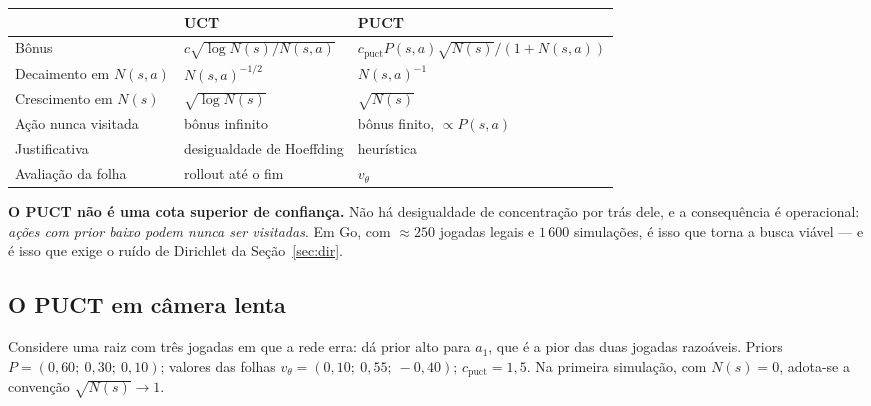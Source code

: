 \documentclass[11pt]{article}
\newcommand{\cpuct}{c_{\mathrm{puct}}}
\newcommand{\Nvis}{N}
\newcommand{\redeval}{v_{\theta}}
\begin{document}
\begin{center}
\begin{tabular}{lll}
\toprule
 & \textbf{UCT} & \textbf{PUCT} \\
\midrule
Bônus & $c\sqrt{\log \Nvis(s)/\Nvis(s,a)}$ & $\cpuct P(s,a)\sqrt{\Nvis(s)}/(1+\Nvis(s,a))$ \\
Decaimento em $\Nvis(s,a)$ & $\Nvis(s,a)^{-1/2}$ & $\Nvis(s,a)^{-1}$ \\
Crescimento em $\Nvis(s)$ & $\sqrt{\log \Nvis(s)}$ & $\sqrt{\Nvis(s)}$ \\
Ação nunca visitada & bônus infinito & bônus finito, $\propto P(s,a)$ \\
Justificativa & desigualdade de Hoeffding & heurística \\
Avaliação da folha & rollout até o fim & $\redeval$ \\
\bottomrule
\end{tabular}
\end{center}

\begin{alertabox}
\textbf{O PUCT não é uma cota superior de confiança.} Não há desigualdade de
concentração por trás dele, e a consequência é operacional: \emph{ações com prior
baixo podem nunca ser visitadas}. Em Go, com $\approx 250$ jogadas legais e
$1\,600$ simulações, é isso que torna a busca viável — e é isso que exige o ruído
de Dirichlet da Seção~\ref{sec:dir}.
\end{alertabox}

\subsection{O PUCT em câmera lenta}
\label{sec:traco}

Considere uma raiz com três jogadas em que a rede erra: dá prior alto para $a_1$,
que é a pior das duas jogadas razoáveis. Priors $P = (0{,}60;\ 0{,}30;\ 0{,}10)$;
valores das folhas $\redeval = (0{,}10;\ 0{,}55;\ -0{,}40)$; $\cpuct = 1{,}5$.
Na primeira simulação, com $\Nvis(s)=0$, adota-se a convenção
$\sqrt{\Nvis(s)} \to 1$.
\end{document}

